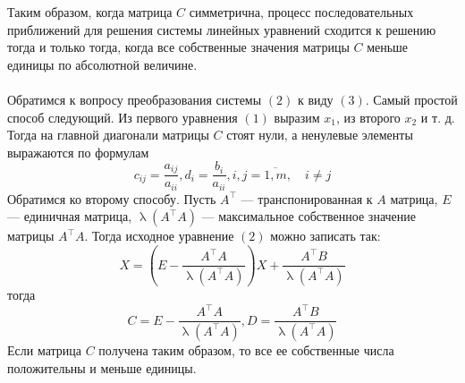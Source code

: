 \documentclass[a4paper, 12pt]{report}
\renewcommand{\lambda}{\uplambda}
\begin{document}
	Таким образом, когда матрица $C$ симметрична, процесс последовательных приближений для решения системы линейных уравнений сходится к решению тогда и только тогда, когда все собственные значения матрицы $C$ меньше единицы по абсолютной величине.\\\\
	Обратимся к вопросу преобразования системы $(2)$ к виду $(3)$.
	Самый простой способ следующий. Из первого уравнения $(1)$ выразим $x_{1}$, из второго $x_{2}$ и т. д. Тогда на главной диагонали матрицы $C$ стоят нули, а ненулевые элементы выражаются по формулам
	$$
	c_{i j}=\frac{a_{i j}}{a_{i i}}, d_{i}=\frac{b_{i}}{a_{i i}}, i, j=\overline{1, m},\quad i \neq j
	$$
	Обратимся ко второму способу. Пусть $A^{\top}$ --- транспонированная к $A$ матрица, $E$ --- единичная матрица, $\lambda\left(A^{\top} A\right)$ --- максимальное собственное значение матрицы $A^{\top} A$. Тогда исходное уравнение $(2)$ можно записать так:
	$$
	X=\left(E-\frac{A^{\top} A}{\lambda\left(A^{\top} A\right)}\right) X+\frac{A^{\top} B}{\lambda\left(A^{\top} A\right)}
	$$
	тогда
	$$
	C=E-\frac{A^{\top} A}{\lambda\left(A^{\top} A\right)}, D=\frac{A^{\top} B}{\lambda\left(A^{\top} A\right)}
	$$
	Если матрица $C$ получена таким образом, то все ее собственные числа положительны и меньше единицы.
\end{document}
